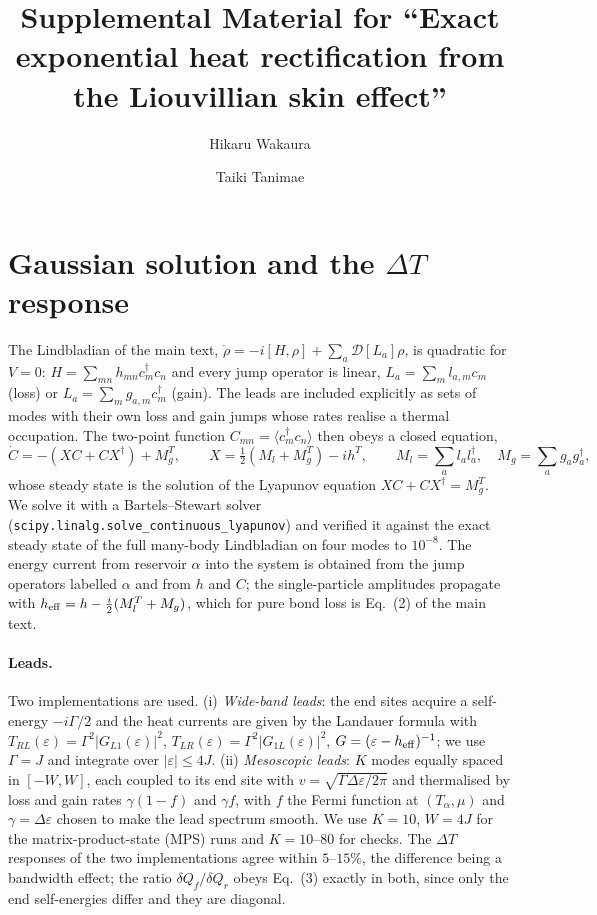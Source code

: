 \documentclass[aps,prl,superscriptaddress,nofootinbib,onecolumn,notitlepage,11pt]{revtex4-2}
\newcommand{\dQ}{\delta Q}
\newcommand{\heff}{h_{\rm eff}}
\begin{document}
\title{Supplemental Material for ``Exact exponential heat rectification from the Liouvillian skin effect''}
\author{Hikaru Wakaura}
\author{Taiki Tanimae}
\maketitle

\section{Gaussian solution and the $\Delta T$ response}
\label{sec:gauss}

The Lindbladian of the main text, $\dot\rho=-i[H,\rho]+\sum_a\mathcal{D}[L_a]\rho$, is quadratic for $V=0$: $H=\sum_{mn}h_{mn}c_m^\dagger c_n$ and every jump operator is linear, $L_a=\sum_m l_{a,m}c_m$ (loss) or $L_a=\sum_m g_{a,m}c_m^\dagger$ (gain). The leads are included explicitly as sets of modes with their own loss and gain jumps whose rates realise a thermal occupation. The two-point function $C_{mn}=\langle c_m^\dagger c_n\rangle$ then obeys a closed equation,
\begin{equation}
\dot C=-(XC+CX^\dagger)+M_g^{T},\qquad X=\tfrac12(M_l+M_g^{T})-ih^{T},\qquad M_l=\sum_a l_al_a^\dagger,\quad M_g=\sum_a g_ag_a^\dagger,
\end{equation}
whose steady state is the solution of the Lyapunov equation $XC+CX^\dagger=M_g^{T}$. We solve it with a Bartels--Stewart solver (\texttt{scipy.linalg.solve\_continuous\_lyapunov}) and verified it against the exact steady state of the full many-body Lindbladian on four modes to $10^{-8}$. The energy current from reservoir $\alpha$ into the system is obtained from the jump operators labelled $\alpha$ and from $h$ and $C$; the single-particle amplitudes propagate with $\heff=h-\tfrac{i}{2}(M_l^{T}+M_g)$, which for pure bond loss is Eq.~(2) of the main text.

\paragraph{Leads.}
Two implementations are used. (i) \emph{Wide-band leads}: the end sites acquire a self-energy $-i\Gamma/2$ and the heat currents are given by the Landauer formula with $T_{RL}(\varepsilon)=\Gamma^2|G_{L1}(\varepsilon)|^2$, $T_{LR}(\varepsilon)=\Gamma^2|G_{1L}(\varepsilon)|^2$, $G=(\varepsilon-\heff)^{-1}$; we use $\Gamma=J$ and integrate over $|\varepsilon|\le4J$. (ii) \emph{Mesoscopic leads}: $K$ modes equally spaced in $[-W,W]$, each coupled to its end site with $v=\sqrt{\Gamma\Delta\varepsilon/2\pi}$ and thermalised by loss and gain rates $\gamma(1-f)$ and $\gamma f$, with $f$ the Fermi function at $(T_\alpha,\mu)$ and $\gamma=\Delta\varepsilon$ chosen to make the lead spectrum smooth. We use $K=10$, $W=4J$ for the matrix-product-state (MPS) runs and $K=10$--$80$ for checks. The $\Delta T$ responses of the two implementations agree within $5$--$15\%$, the difference being a bandwidth effect; the ratio $\dQ_f/\dQ_r$ obeys Eq.~(3) exactly in both, since only the end self-energies differ and they are diagonal.
\end{document}
